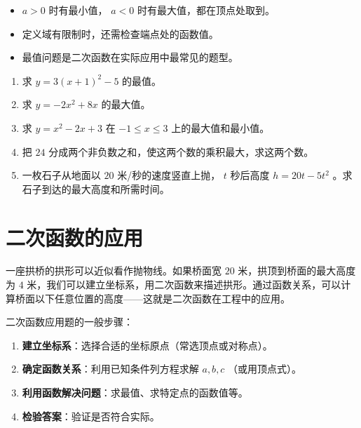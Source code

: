 \begin{keytakeaway}


\begin{itemize}
  \item $a > 0$ 时有最小值， $a < 0$ 时有最大值，都在顶点处取到。
  \item 定义域有限制时，还需检查端点处的函数值。
  \item 最值问题是二次函数在实际应用中最常见的题型。
\end{itemize}


\end{keytakeaway}

\begin{practice}


\begin{enumerate}
  \item 求 $y = 3(x + 1)^2 - 5$ 的最值。
  \item 求 $y = -2x^2 + 8x$ 的最大值。
  \item 求 $y = x^2 - 2x + 3$ 在 $-1 \leq x \leq 3$ 上的最大值和最小值。
  \item 把 $24$ 分成两个非负数之和，使这两个数的乘积最大，求这两个数。
  \item 一枚石子从地面以 $20$ 米/秒的速度竖直上抛， $t$ 秒后高度 $h = 20t - 5t^2$ 。求石子到达的最大高度和所需时间。
\end{enumerate}


\end{practice}

\section*{二次函数的应用}


\begin{explore}


一座拱桥的拱形可以近似看作抛物线。如果桥面宽 $20$ 米，拱顶到桥面的最大高度为 $4$ 米，我们可以建立坐标系，用二次函数来描述拱形。通过函数关系，可以计算桥面以下任意位置的高度——这就是二次函数在工程中的应用。

\end{explore}

\begin{understand}


二次函数应用题的一般步骤：

\begin{enumerate}
  \item \textbf{建立坐标系}：选择合适的坐标原点（常选顶点或对称点）。
  \item \textbf{确定函数关系}：利用已知条件列方程求解 $a, b, c$ （或用顶点式）。
  \item \textbf{利用函数解决问题}：求最值、求特定点的函数值等。
  \item \textbf{检验答案}：验证是否符合实际。
\end{enumerate}


\end{understand}

